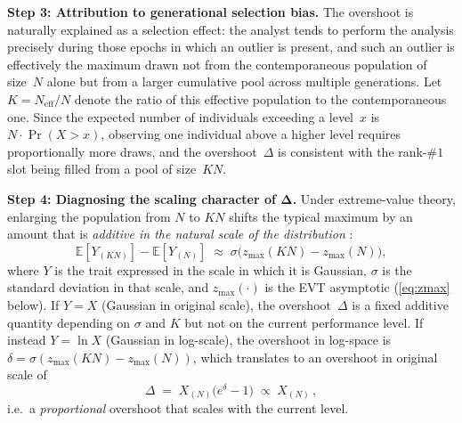 \documentclass{article}
\begin{document}
\medskip
\noindent\textbf{Step 3: Attribution to generational selection bias.}\;
The overshoot is naturally explained as a selection effect: the analyst
tends to perform the analysis precisely during those epochs in which an
outlier is present, and such an outlier is effectively the maximum drawn not
from the contemporaneous population of size~$N$ alone but from a larger
cumulative pool across multiple generations. Let $K = N_{\mathrm{eff}} / N$
denote the ratio of this effective population to the contemporaneous one.
Since the expected number of individuals exceeding a level~$x$ is
$N \cdot \Pr(X > x)$, observing one individual above a higher level
requires proportionally more draws, and the overshoot~$\Delta$ is
consistent with the rank-$\#1$ slot being filled from a pool of
size~$K N$.

\medskip
\noindent\textbf{Step 4: Diagnosing the scaling character of
$\boldsymbol{\Delta}$.}\;
Under extreme-value theory, enlarging the population from $N$ to $KN$
shifts the typical maximum by an amount that is \emph{additive in the
natural scale of the distribution}
\cite{leadbetter1983,embrechts1997}:
\[
  \mathbb{E}[Y_{(KN)}] - \mathbb{E}[Y_{(N)}]
  \;\approx\;
  \sigma\bigl(z_{\max}(KN) - z_{\max}(N)\bigr),
\]
where $Y$ is the trait expressed in the scale in which it is Gaussian,
$\sigma$ is the standard deviation in that scale, and $z_{\max}(\cdot)$ is
the EVT asymptotic (\ref{eq:zmax} below). If $Y = X$ (Gaussian in
original scale), the overshoot~$\Delta$ is a fixed additive quantity
depending on $\sigma$ and $K$ but not on the current performance level. If
instead $Y = \ln X$ (Gaussian in log-scale), the overshoot in log-space is
$\delta = \sigma(z_{\max}(KN) - z_{\max}(N))$, which translates to an
overshoot in original scale of
\[
  \Delta
  \;=\;
  X_{(N)}\bigl(e^{\delta} - 1\bigr)
  \;\propto\;
  X_{(N)}\,,
\]
i.e.\ a \emph{proportional} overshoot that scales with the current level.
\end{document}
